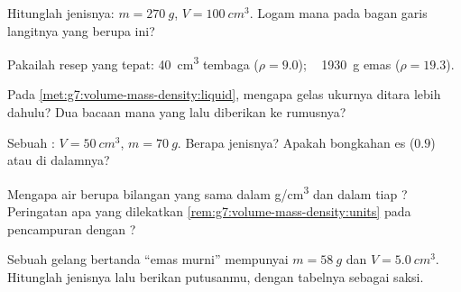 \begin{exercise}[$\star$]\label{exo:g7:volume-mass-density:2}
Hitunglah  jenisnya: $m = \qty{270}{g}$, $V = \qty{100}{cm^3}$.
Logam mana pada bagan garis langitnya yang berupa ini?
\end{exercise}

\begin{exercise}[$\star$]\label{exo:g7:volume-mass-density:3}
Pakailah resep yang tepat:  \qty{40}{cm^3} tembaga
($\rho = 9.0$); \  \qty{1930}{g} emas
($\rho = 19.3$).
\end{exercise}

\begin{exercise}[$\star$]\label{exo:g7:volume-mass-density:4}
Pada \cref{met:g7:volume-mass-density:liquid}, mengapa gelas ukurnya
ditara lebih dahulu? Dua bacaan mana yang lalu diberikan ke rumusnya?
\end{exercise}

\begin{exercise}[$\star$]\label{exo:g7:volume-mass-density:5}
Sebuah : $V = \qty{50}{cm^3}$, $m = \qty{70}{g}$. Berapa 
jenisnya? Apakah bongkahan es ($0.9$)  atau  di
dalamnya?
\end{exercise}

\begin{exercise}[$\star$]\label{exo:g7:volume-mass-density:6}
Mengapa  air berupa bilangan yang sama dalam \unit{g/cm^3}
dan dalam  tiap ? Peringatan apa yang dilekatkan
\cref{rem:g7:volume-mass-density:units} pada pencampuran  dengan
?
\end{exercise}

\begin{exercise}[$\star$]\label{exo:g7:volume-mass-density:7}
Sebuah gelang bertanda ``emas murni'' mempunyai $m = \qty{58}{g}$ dan
$V = \qty{5.0}{cm^3}$. Hitunglah  jenisnya lalu berikan
putusanmu, dengan tabelnya sebagai saksi.
\end{exercise}

